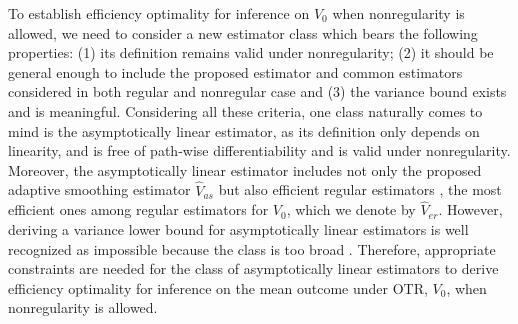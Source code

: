 \documentclass[11pt]{article}
\theoremstyle{referenceplain}
\theoremstyle{referencedefinition}
\theoremstyle{referenceremark}
\begin{document}

To establish efficiency optimality for inference on $V_0$ when nonregularity is allowed, we need to consider a new estimator class which bears the following properties: (1) its definition remains valid under nonregularity; (2) it should be general enough to include the proposed estimator and common estimators considered in both regular and nonregular case and (3) the variance bound exists and is meaningful. Considering all these criteria, one class naturally comes to mind is the asymptotically linear estimator,
as its definition only depends on linearity, and is free of path-wise differentiability and is valid under nonregularity. Moreover, the asymptotically linear estimator includes not only the proposed adaptive smoothing estimator $\widehat{V}_{as}$ but also efficient regular estimators \citep{bickel1993efficient}, the most efficient ones among regular estimators for $V_0$, which we denote by $\widehat{V}_{er}$. However, deriving a variance lower bound for asymptotically linear estimators is  well recognized as impossible because the class is too broad \citep{van2000asymptotic}. Therefore, appropriate constraints are needed for the class of  asymptotically linear estimators to derive efficiency optimality for inference on the mean outcome under OTR, $V_0$, when nonregularity is allowed. 

\end{document}
